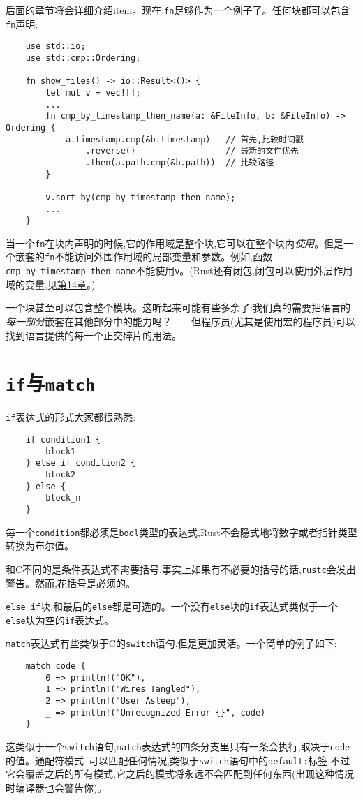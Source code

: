 后面的章节将会详细介绍item。现在,\texttt{fn}足够作为一个例子了。任何块都可以包含\texttt{fn}声明:
\begin{verbatim}
    use std::io;
    use std::cmp::Ordering;

    fn show_files() -> io::Result<()> {
        let mut v = vec![];
        ...
        fn cmp_by_timestamp_then_name(a: &FileInfo, b: &FileInfo) -> Ordering {
            a.timestamp.cmp(&b.timestamp)   // 首先,比较时间戳 
                .reverse()                  // 最新的文件优先
                .then(a.path.cmp(&b.path))  // 比较路径
        }

        v.sort_by(cmp_by_timestamp_then_name);
        ...
    }
\end{verbatim}

当一个\texttt{fn}在块内声明的时候,它的作用域是整个块,它可以在整个块内\emph{使用}。但是一个嵌套的\texttt{fn}不能访问外围作用域的局部变量和参数。例如,函数\texttt{cmp\_by\_timestamp\_then\_name}不能使用\texttt{v}。(Rust还有闭包,闭包可以使用外层作用域的变量,见\hyperref[ch14]{第14章}。)

一个块甚至可以包含整个模块。这听起来可能有些多余了:我们真的需要把语言的\emph{每一部分}嵌套在其他部分中的能力吗？——但程序员(尤其是使用宏的程序员)可以找到语言提供的每一个正交碎片的用法。

\section{\texttt{if}与\texttt{match}}

\texttt{if}表达式的形式大家都很熟悉:
\begin{verbatim}
    if condition1 {
        block1
    } else if condition2 {
        block2
    } else {
        block_n
    }
\end{verbatim}

每一个\texttt{condition}都必须是\texttt{bool}类型的表达式,Rust不会隐式地将数字或者指针类型转换为布尔值。

和C不同的是条件表达式不需要括号,事实上如果有不必要的括号的话,\texttt{rustc}会发出警告。然而,花括号是必须的。

\texttt{else if}块,和最后的\texttt{else}都是可选的。一个没有\texttt{else}块的\texttt{if}表达式类似于一个\texttt{else}块为空的\texttt{if}表达式。

\texttt{match}表达式有些类似于C的\texttt{switch}语句,但是更加灵活。一个简单的例子如下:
\begin{verbatim}
    match code {
        0 => println!("OK"),
        1 => println!("Wires Tangled"),
        2 => println!("User Asleep"),
        _ => println!("Unrecognized Error {}", code)
    }
\end{verbatim}
这类似于一个\texttt{switch}语句,\texttt{match}表达式的四条分支里只有一条会执行,取决于\texttt{code}的值。通配符模式\texttt{\_}可以匹配任何情况,类似于\texttt{switch}语句中的\texttt{default:}标签,不过它会覆盖之后的所有模式,它之后的模式将永远不会匹配到任何东西(出现这种情况时编译器也会警告你)。

